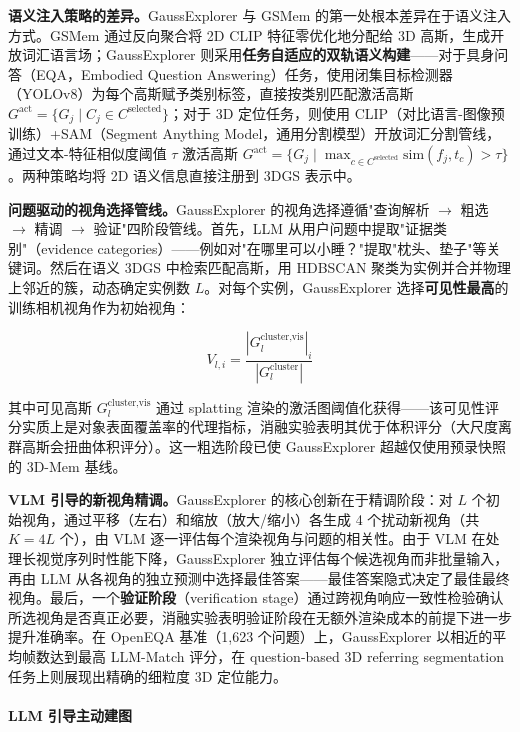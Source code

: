\textbf{语义注入策略的差异。}GaussExplorer 与 GSMem 的第一处根本差异在于语义注入方式。GSMem 通过反向聚合将 2D CLIP 特征零优化地分配给 3D 高斯，生成开放词汇语言场；GaussExplorer 则采用\textbf{任务自适应的双轨语义构建}——对于具身问答（EQA，Embodied Question Answering）任务，使用闭集目标检测器（YOLOv8）为每个高斯赋予类别标签，直接按类别匹配激活高斯 $G^{\text{act}} = \{G_j \mid C_j \in C^{\text{selected}}\}$；对于 3D 定位任务，则使用 CLIP（对比语言-图像预训练）+SAM（Segment Anything Model，通用分割模型）开放词汇分割管线，通过文本-特征相似度阈值 $\tau$ 激活高斯 $G^{\text{act}} = \{G_j \mid \max_{c \in C^{\text{selected}}} \text{sim}(f_j, t_c) > \tau\}$。两种策略均将 2D 语义信息直接注册到 3DGS 表示中。

\textbf{问题驱动的视角选择管线。}GaussExplorer 的视角选择遵循"查询解析 $\to$ 粗选 $\to$ 精调 $\to$ 验证"四阶段管线。首先，LLM 从用户问题中提取"证据类别"（evidence categories）——例如对"在哪里可以小睡？"提取"枕头、垫子"等关键词。然后在语义 3DGS 中检索匹配高斯，用 HDBSCAN 聚类为实例并合并物理上邻近的簇，动态确定实例数 $L$。对每个实例，GaussExplorer 选择\textbf{可见性最高}的训练相机视角作为初始视角：

\begin{equation}
V_{l,i} = \frac{|G_l^{\text{cluster,vis}}|_i}{|G_l^{\text{cluster}}|}
\end{equation}

其中可见高斯 $G_l^{\text{cluster,vis}}$ 通过 splatting 渲染的激活图阈值化获得——该可见性评分实质上是对象表面覆盖率的代理指标，消融实验表明其优于体积评分（大尺度离群高斯会扭曲体积评分）。这一粗选阶段已使 GaussExplorer 超越仅使用预录快照的 3D-Mem 基线。

\textbf{VLM 引导的新视角精调。}GaussExplorer 的核心创新在于精调阶段：对 $L$ 个初始视角，通过平移（左右）和缩放（放大/缩小）各生成 4 个扰动新视角（共 $K = 4L$ 个），由 VLM 逐一评估每个渲染视角与问题的相关性。由于 VLM 在处理长视觉序列时性能下降，GaussExplorer 独立评估每个候选视角而非批量输入，再由 LLM 从各视角的独立预测中选择最佳答案——最佳答案隐式决定了最佳最终视角。最后，一个\textbf{验证阶段}（verification stage）通过跨视角响应一致性检验确认所选视角是否真正必要，消融实验表明验证阶段在无额外渲染成本的前提下进一步提升准确率。在 OpenEQA 基准（1,623 个问题）上，GaussExplorer 以相近的平均帧数达到最高 LLM-Match 评分，在 question-based 3D referring segmentation 任务上则展现出精确的细粒度 3D 定位能力。

\paragraph{LLM 引导主动建图}

